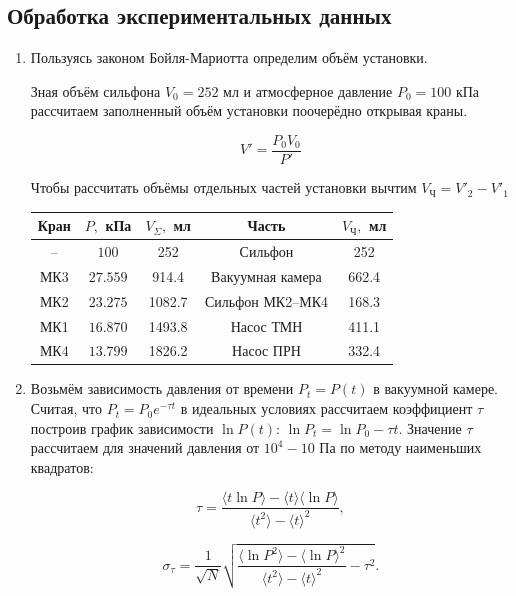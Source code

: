 \documentclass[a4paper,12pt]{article} %
\begin{document}
\FloatBarrier

\subsection{Обработка экспериментальных данных}

\begin{enumerate}
\item Пользуясь законом Бойля-Мариотта определим объём установки.

Зная объём сильфона $V_0 = 252$ мл и атмосферное давление $P_0 = 100$ кПа рассчитаем заполненный объём установки поочерёдно открывая краны.

\[
V' = \frac{P_0 V_0}{P'}
\]

Чтобы рассчитать объёмы отдельных частей установки вычтим $V_\text{Ч} = V'_2 - V'_1$

\begin{center}
\begin{tabular}{|c|c|c|c|c|}
\hline 
Кран & $P, $ кПа & $V_\Sigma, $ мл & Часть & $V_\text{Ч}, $ мл \\ 
\hline 
-- & $100$ & 252 & Сильфон & 252 \\ 
\hline 
МК3 & $27.559$ & 914.4 & Вакуумная камера & 662.4 \\ 
\hline 
МК2 & $23.275$ & 1082.7 & Сильфон МК2--МК4 & 168.3 \\ 
\hline 
МК1 & $16.870$ & 1493.8 & Насос ТМН & 411.1 \\ 
\hline 
МК4 & $13.799$ & 1826.2 & Насос ПРН & 332.4 \\ 
\hline 
\end{tabular} 
\end{center}

\item Возьмём зависимость давления от времени $P_t = P(t)$ в вакуумной камере. Считая, что $P_t = P_0 e^{-\tau t}$ в идеальных условиях рассчитаем коэффициент $ \tau $ построив график зависимости $\ln{P}(t)$: $ \ln{P_t} = \ln{P_0} - \tau t $. Значение $\tau$ рассчитаем для значений давления от $10^{4} - 10$ Па по методу наименьших квадратов:

\[
\tau = \frac{\langle t\ln{P} \rangle - \langle t \rangle \langle \ln{P} \rangle}{\langle t^2 \rangle - \langle t \rangle ^ 2},
\]

\[
\sigma_\tau = \frac{1}{\sqrt{N}}\sqrt{\frac{\langle \ln{P}^2 \rangle - \langle \ln{P} \rangle ^ 2}{\langle t^2 \rangle - \langle t \rangle ^ 2} - \tau^2}.
\]


\end{enumerate}
\end{document}
